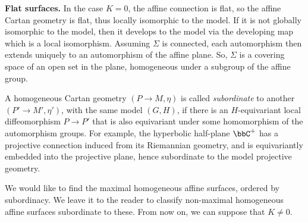\textbf{Flat surfaces.} In the case $K=0$, the affine connection  is flat, so the affine Cartan geometry is flat, thus locally isomorphic to the model. If it is not globally isomorphic to the model, then it develops to the model via the developing map which is a local isomorphism. Assuming $\varSigma$ is connected, each automorphism then extends uniquely to an automorphism of the affine plane. So, $\varSigma$ is a covering space of an open set in the plane, homogeneous under a subgroup of the affine group. 

A homogeneous Cartan geometry $(P\to M,\eta)$ is called \emph{subordinate} to another $(P'\to M',\eta')$, with the same model $(G,H)$, if there is an $H$-equivariant local diffeomorphism $P\to P'$ that is also equivariant under some homomorphism of the automorphism groups. For example, the hyperbolic half-plane $\bbC^+$ has a projective connection induced from its Riemannian geometry, and is equivariantly embedded into the projective plane, hence subordinate to the model projective geometry. 

We would like to find the maximal homogeneous affine surfaces, ordered by subordinacy. We leave it to the reader to classify non-maximal homogeneous affine surfaces subordinate to these. From now on, we can suppose that $K\neq 0$.

